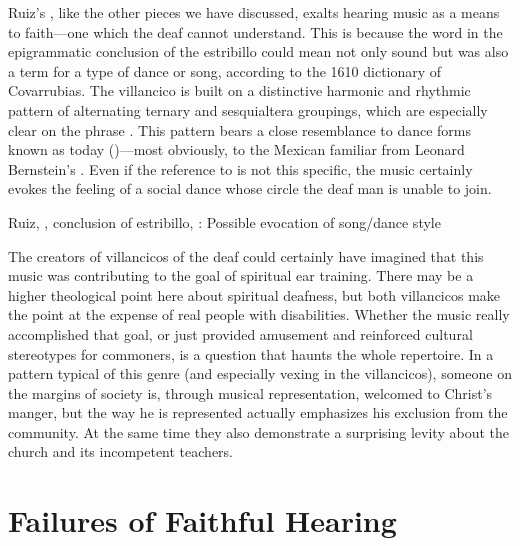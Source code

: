 Ruiz's , like the other pieces we have discussed, exalts hearing music as a means to faith---one which the deaf cannot understand.
This is because the word  in the epigrammatic conclusion of the estribillo could mean not only sound but was also a term for a type of dance or song, according to the 1610 dictionary of Covarrubias.
The villancico is built on a distinctive harmonic and rhythmic pattern of alternating ternary and sesquialtera groupings, which are especially clear on the phrase .
This pattern bears a close resemblance to dance forms known as  today ()---most obviously, to the Mexican  familiar from Leonard Bernstein's .%
    \Autocite[]{Grove}
Even if the reference to  is not this specific, the music certainly evokes the feeling of a social dance whose circle the deaf man is unable to join.


\begin{exmusic}
    \caption{Ruiz, , conclusion of estribillo, : Possible evocation of  song/dance style}
    \label{exmusic:Ruiz-Sordos-son}
\end{exmusic}

The creators of villancicos of the deaf could certainly have imagined that this music was contributing to the goal of spiritual ear training.
There may be a higher theological point here about spiritual deafness, but both  villancicos make the point at the expense of real people with disabilities.
Whether the music really accomplished that goal, or just provided amusement and reinforced cultural stereotypes for commoners, is a question that haunts the whole repertoire.
In a pattern typical of this genre (and especially vexing in the  villancicos), someone on the margins of society is, through musical representation, welcomed to Christ's manger, but the way he is represented actually emphasizes his exclusion from the community.
At the same time they also demonstrate a surprising levity about the church and its incompetent teachers.


\section{Failures of Faithful Hearing}

